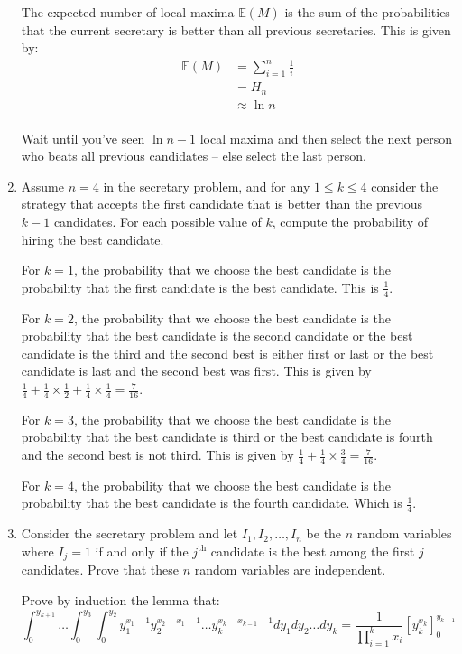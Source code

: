 \documentclass[10pt,\jkfside,a4paper]{article}
\begin{document}
\begin{enumerate}
The expected number of local maxima $\mathbb{E}(M)$ is the sum of the probabilities that the current secretary is
better than all previous secretaries. This is given by:
\[
\begin{split}
\mathbb{E}(M) &= \sum^{n}_{i=1} \frac{1}{i} \\
&= H_{n} \\
&\approx \ln n \\
\end{split}
\]

Wait until you've seen $\ln n - 1$ local maxima and then select the next person who beats
all previous candidates -- else select the last person.

\setcounter{enumi}{6}

\item Assume $n = 4$ in the secretary problem, and for any $1 \leq k \leq 4$ consider the strategy that accepts the
first candidate that is better than the previous $k - 1$ candidates. For each possible value of $k$, compute the
probability of hiring the best candidate.

For $k = 1$, the probability that we choose the best candidate is the probability that the
first candidate is the best candidate. This is $\frac{1}{4}$.

For $k = 2$, the probability that we choose the best candidate is the probability that the
best candidate is the second candidate or the best candidate is the third and the second best
is either first or last or the best candidate is last and the second best was first.
This is given by $\frac{1}{4} + \frac{1}{4}\times\frac{1}{2} + \frac{1}{4} \times \frac{1}{4} = \frac{7}{16}$.

For $k = 3$, the probability that we choose the best candidate is the probability that the best candidate is third
or the best candidate is fourth and the second best is not third. This is given by $\frac{1}{4} +
\frac{1}{4}\times\frac{3}{4} = \frac{7}{16} $.

For $k = 4$, the probability that we choose the best candidate is the probability that the best candidate is the
fourth candidate. Which is $\frac{1}{4}$.

\item Consider the secretary problem and let $I_1, I_2, \dots, I_n$ be the $n$ random variables where $I_j = 1$ if
and only if the $j^{\text{th}}$ candidate is the best among the first $j$ candidates. Prove that these $n$ random
variables are independent.

Prove by induction the lemma that:
\[
\int^{y_{k+1}}_0 \dots \int^{y_3}_0 \int^{y_2}_0 y_1^{x_1 - 1} y_2^{x_2 - x_1 - 1} \dots y_k^{x_k - x_{k - 1} - 1} dy_1
dy_2 \dots dy_k = \frac{1}{\prod^k_{i=1}x_i}\left[ y_{k}^{x_k} \right]^{y_{k+1}}_0
\]


\end{enumerate}
\end{document}
